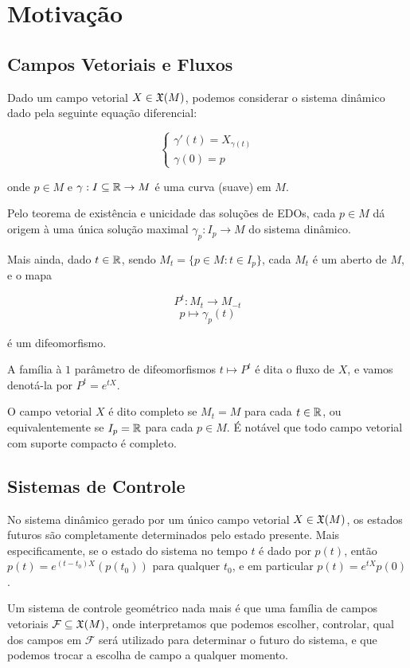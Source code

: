 
\section{Motivação}

\subsection{Campos Vetoriais e Fluxos}

Dado um campo vetorial $X \in \mathfrak{X}(M)$,
podemos considerar o sistema dinâmico
dado pela seguinte equação diferencial:

$$\begin{cases}
    \gamma'(t) = X_{\gamma(t)}\\
    \gamma(0) = p
\end{cases}$$

onde $p \in M$ e $\gamma: I\subseteq \mathbb{R} \to M$ é uma curva (suave) em $M$.

Pelo teorema de existência e unicidade das soluções
de EDOs, cada $p \in M$ dá origem à uma única solução
maximal $\gamma_p : I_p \to M$ do sistema dinâmico.

Mais ainda, dado $t \in \mathbb{R}$,
sendo $M_t = \{p \in M : t \in I_p\}$, cada $M_t$ é
um aberto de $M$, e o mapa

$$P^t : M_t \to M_{-t}$$
$$p \mapsto \gamma_p(t)$$

é um difeomorfismo.

A família à $1$ parâmetro de difeomorfismos $t\mapsto P^t$ é dita o fluxo
de $X$, e vamos denotá-la por $P^t = e^{tX}$.

O campo vetorial $X$ é dito completo
se $M_t = M$ para cada $t \in \mathbb{R}$, ou equivalentemente
se $I_p = \mathbb{R}$ para cada $p \in M$. É notável que todo campo vetorial
com suporte compacto é completo.

\subsection{Sistemas de Controle}

No sistema dinâmico gerado por um único campo vetorial $X \in \mathfrak{X}(M)$,
os estados futuros são completamente determinados pelo estado presente.
Mais especificamente, se o estado do sistema no tempo $t$ é dado
por $p(t)$, então $p(t) = e^{(t-t_0)X} (p(t_0))$ para qualquer $t_0$,
e em particular $p(t) = e^{tX} p(0)$.

Um sistema de controle geométrico
nada mais é que uma família de campos vetoriais
$\mathcal{F} \subseteq \mathfrak{X}(M)$, onde interpretamos que podemos escolher,
controlar,
qual dos campos em $\mathcal{F}$ será utilizado para determinar o futuro
do sistema, e que podemos trocar a escolha de campo a qualquer momento.

